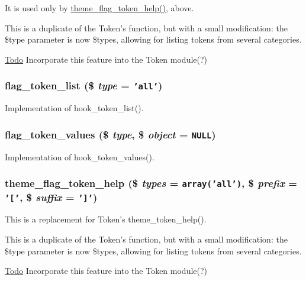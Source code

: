 It is used only by \hyperlink{flag_8token_8inc_19695478804e51a9c21274a3acbf3387}{theme\_\-flag\_\-token\_\-help()}, above.

This is a duplicate of the Token's function, but with a small modification: the \$type parameter is now \$types, allowing for listing tokens from several categories.

\begin{Desc}
\item[\hyperlink{todo__todo000005}{Todo}]Incorporate this feature into the Token module(?) \end{Desc}
\hypertarget{flag_8token_8inc_1f02eb9b8c7ce2009805b9c47ec45b20}{
\subsubsection[{flag\_\-token\_\-list}]{\setlength{\rightskip}{0pt plus 5cm}flag\_\-token\_\-list (\$ {\em type} = {\tt 'all'})}}
\label{flag_8token_8inc_1f02eb9b8c7ce2009805b9c47ec45b20}


Implementation of hook\_\-token\_\-list(). \hypertarget{flag_8token_8inc_52a7ba3fca937ebf4d95df90dc531151}{
\subsubsection[{flag\_\-token\_\-values}]{\setlength{\rightskip}{0pt plus 5cm}flag\_\-token\_\-values (\$ {\em type}, \/  \$ {\em object} = {\tt NULL})}}
\label{flag_8token_8inc_52a7ba3fca937ebf4d95df90dc531151}


Implementation of hook\_\-token\_\-values(). \hypertarget{flag_8token_8inc_19695478804e51a9c21274a3acbf3387}{
\subsubsection[{theme\_\-flag\_\-token\_\-help}]{\setlength{\rightskip}{0pt plus 5cm}theme\_\-flag\_\-token\_\-help (\$ {\em types} = {\tt array('all')}, \/  \$ {\em prefix} = {\tt '\mbox{[}'}, \/  \$ {\em suffix} = {\tt '\mbox{]}'})}}
\label{flag_8token_8inc_19695478804e51a9c21274a3acbf3387}


This is a replacement for Token's theme\_\-token\_\-help().

This is a duplicate of the Token's function, but with a small modification: the \$type parameter is now \$types, allowing for listing tokens from several categories.

\begin{Desc}
\item[\hyperlink{todo__todo000004}{Todo}]Incorporate this feature into the Token module(?) \end{Desc}

